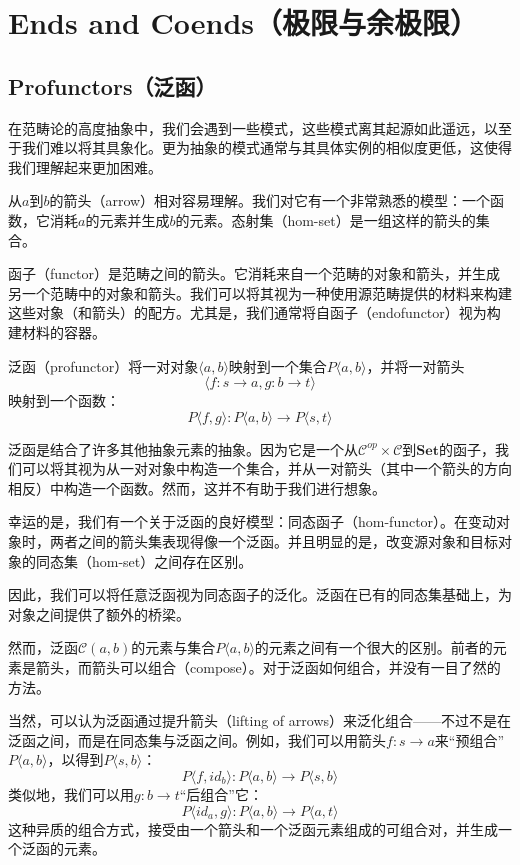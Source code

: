 \documentclass[DaoFP]{subfiles}
\begin{document}
 \setcounter{chapter}{16}

 \chapter{Ends and Coends（极限与余极限）}

 \section{Profunctors（泛函）}

 在范畴论的高度抽象中，我们会遇到一些模式，这些模式离其起源如此遥远，以至于我们难以将其具象化。更为抽象的模式通常与其具体实例的相似度更低，这使得我们理解起来更加困难。

 从$a$到$b$的箭头（arrow）相对容易理解。我们对它有一个非常熟悉的模型：一个函数，它消耗$a$的元素并生成$b$的元素。态射集（hom-set）是一组这样的箭头的集合。

 函子（functor）是范畴之间的箭头。它消耗来自一个范畴的对象和箭头，并生成另一个范畴中的对象和箭头。我们可以将其视为一种使用源范畴提供的材料来构建这些对象（和箭头）的配方。尤其是，我们通常将自函子（endofunctor）视为构建材料的容器。

 泛函（profunctor）将一对对象$\langle a, b \rangle$映射到一个集合$P\langle a, b \rangle$，并将一对箭头
 \[ \langle f \colon s \to a, g \colon b \to t \rangle \]
 映射到一个函数：
 \[ P\langle f, g \rangle \colon P\langle a, b \rangle \to P\langle s, t \rangle \]

 泛函是结合了许多其他抽象元素的抽象。因为它是一个从$ \mathcal{C}^{op} \times  \mathcal{C}$到$\mathbf{Set}$的函子，我们可以将其视为从一对对象中构造一个集合，并从一对箭头（其中一个箭头的方向相反）中构造一个函数。然而，这并不有助于我们进行想象。

 幸运的是，我们有一个关于泛函的良好模型：同态函子（hom-functor）。在变动对象时，两者之间的箭头集表现得像一个泛函。并且明显的是，改变源对象和目标对象的同态集（hom-set）之间存在区别。

 因此，我们可以将任意泛函视为同态函子的泛化。泛函在已有的同态集基础上，为对象之间提供了额外的桥梁。

 然而，泛函$ \mathcal{C}(a, b)$的元素与集合$P\langle a, b \rangle$的元素之间有一个很大的区别。前者的元素是箭头，而箭头可以组合（compose）。对于泛函如何组合，并没有一目了然的方法。

 当然，可以认为泛函通过提升箭头（lifting of arrows）来泛化组合——不过不是在泛函之间，而是在同态集与泛函之间。例如，我们可以用箭头$f \colon s \to a$来“预组合”$P \langle a, b \rangle$，以得到$P \langle s, b \rangle$：
 \[ P\langle f, id_b \rangle \colon P \langle a, b \rangle \to P \langle s, b \rangle \]
 类似地，我们可以用$g \colon b \to t$“后组合”它：
 \[ P \langle id_a, g \rangle \colon P \langle a, b \rangle \to P \langle a, t \rangle \]
 这种异质的组合方式，接受由一个箭头和一个泛函元素组成的可组合对，并生成一个泛函的元素。
\end{document}
